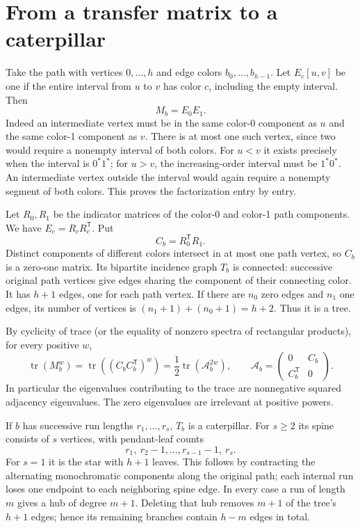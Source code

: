 \documentclass[11pt,letterpaper]{article}
\numberwithin{equation}{section}
\theoremstyle{remark}\newtheorem{remark}[theorem]{Remark}
\DeclareMathOperator{\tr}{tr}\DeclareMathOperator{\TV}{TV}
\begin{document}
\section{From a transfer matrix to a caterpillar}\label{mdk:asp:sec:tree}
Take the path with vertices $0,\ldots,h$ and edge colors $b_0,\ldots,b_{h-1}$. Let $E_c[u,v]$ be one if the entire interval from $u$ to $v$ has color $c$, including the empty interval. Then
\begin{equation}\label{mdk:asp:eq:factor}
M_b=E_0E_1.
\end{equation}
Indeed an intermediate vertex must be in the same color-0 component as $u$ and the same color-1 component as $v$. There is at most one such vertex, since two would require a nonempty interval of both colors. For $u<v$ it exists precisely when the interval is $0^*1^*$; for $u>v$, the increasing-order interval must be $1^*0^*$. An intermediate vertex outside the interval would again require a nonempty segment of both colors. This proves the factorization entry by entry.

Let $R_0,R_1$ be the indicator matrices of the color-0 and color-1 path components. We have $E_c=R_cR_c^{\mathsf T}$. Put
\[
C_b=R_0^{\mathsf T}R_1.
\]
Distinct components of different colors intersect in at most one path vertex, so $C_b$ is a zero-one matrix. Its bipartite incidence graph $T_b$ is connected: successive original path vertices give edges sharing the component of their connecting color. It has $h+1$ edges, one for each path vertex. If there are $n_0$ zero edges and $n_1$ one edges, its number of vertices is $(n_1+1)+(n_0+1)=h+2$. Thus it is a tree.

By cyclicity of trace (or the equality of nonzero spectra of rectangular products), for every positive $w$,
\begin{equation}\label{mdk:asp:eq:gram}
\tr(M_b^w)=\tr((C_bC_b^{\mathsf T})^w)
 =\frac12\tr(\mathcal A_b^{2w}),\qquad
\mathcal A_b=\begin{pmatrix}0&C_b\\C_b^{\mathsf T}&0\end{pmatrix}.
\end{equation}
In particular the eigenvalues contributing to the trace are nonnegative squared adjacency eigenvalues. The zero eigenvalues are irrelevant at positive powers.

If $b$ has successive run lengths $r_1,\ldots,r_s$, $T_b$ is a caterpillar. For $s\ge2$ its spine consists of $s$ vertices, with pendant-leaf counts
\[
r_1,\ r_2-1,\ldots,r_{s-1}-1,\ r_s.
\]
For $s=1$ it is the star with $h+1$ leaves. This follows by contracting the alternating monochromatic components along the original path; each internal run loses one endpoint to each neighboring spine edge. In every case a run of length $m$ gives a hub of degree $m+1$. Deleting that hub removes $m+1$ of the tree's $h+1$ edges; hence its remaining branches contain $h-m$ edges in total.
\end{document}
